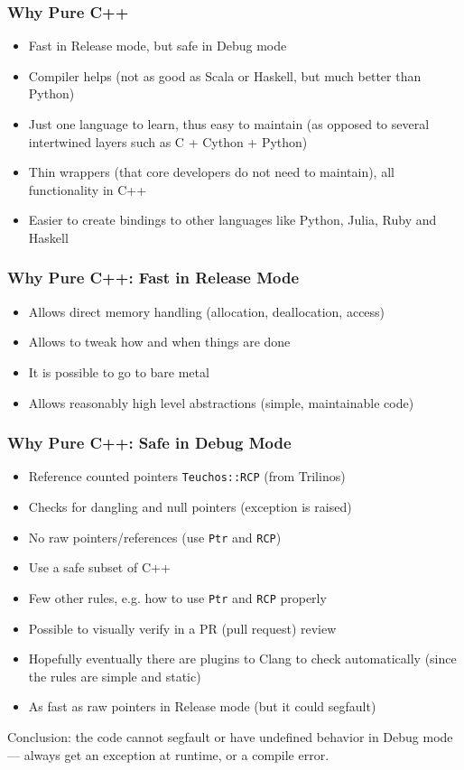 \documentclass{beamer}
\begin{document}
\begin{frame}
\frametitle{Why Pure C++}
\begin{itemize}
\item Fast in Release mode, but safe in Debug mode
\item Compiler helps (not as good as Scala or Haskell, but much better than
    Python)
\item Just one language to learn, thus easy to maintain (as opposed to several
    intertwined layers such as C + Cython + Python)
\item Thin wrappers (that core developers do not need to maintain), all functionality in C++
\item Easier to create bindings to other languages like Python, Julia, Ruby and Haskell
\end{itemize}
\end{frame}

\begin{frame}
\frametitle{Why Pure C++: Fast in Release Mode}
\begin{itemize}
    \item Allows direct memory handling (allocation, deallocation, access)
    \item Allows to tweak how and when things are done
    \item It is possible to go to bare metal
    \item Allows reasonably high level abstractions (simple, maintainable
        code)
\end{itemize}
\end{frame}

\begin{frame}
\frametitle{Why Pure C++: Safe in Debug Mode}
\begin{itemize}
    \item Reference counted pointers \texttt{Teuchos::RCP} (from Trilinos)
    \item Checks for dangling and null pointers (exception is raised)
    \item No raw pointers/references (use \texttt{Ptr} and \texttt{RCP})
    \item Use a safe subset of C++
    \item Few other rules, e.g. how to use \texttt{Ptr} and \texttt{RCP}
          properly
    \item Possible to visually verify in a PR (pull request) review
    \item Hopefully eventually there are plugins to Clang to check
        automatically (since the rules are simple and static)
    \item As fast as raw pointers in Release mode (but it could segfault)
\end{itemize}
    Conclusion: the code cannot segfault or have undefined behavior in Debug
    mode --- always get an exception at runtime, or a compile error.
\end{frame}
\end{document}
